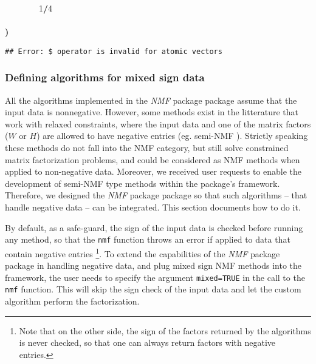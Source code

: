 \documentclass[a4paper]{article}\usepackage{graphicx, color}
\makeatletter
\newcommand{\hlnumber}[1]{\textcolor[rgb]{0,0,0}{#1}}%
\newcommand{\hlkeyword}[1]{\textcolor[rgb]{0,0,0}{\textbf{#1}}}%
\newcommand{\hlstd}[1]{\textcolor[rgb]{0,0,0}{#1}}%
\newenvironment{kframe}{%
 \def\FrameCommand##1{\hskip\@totalleftmargin \hskip-\fboxsep
 \colorbox{shadecolor}{##1}\hskip-\fboxsep
     \hskip-\linewidth \hskip-\@totalleftmargin \hskip\columnwidth}%
 \MakeFramed {\advance\hsize-\width
   \@totalleftmargin\z@ \linewidth\hsize
   \@setminipage}}%
 {\par\unskip\endMakeFramed}
\newenvironment{knitrout}{}{} %
\let\code=\texttt
\newcommand{\pkgname}[1]{\textit{#1}\xspace}
\newcommand{\Rpkg}[1]{\pkgname{#1} package\xspace}
\newcommand{\nmfpack}{\Rpkg{NMF}}
\makeatother
\begin{document}
\begin{knitrout}
\begin{kframe}
\begin{flushleft}
\hlstd{}{\ }{\ }{\ }{\ }{\ }{\ }{\ }{\ }\hlnumber{1}\hlkeyword{/}\hlnumber{4}\hspace*{\fill}\\
\hlstd{}{\ }{\ }{\ }{\ }\hlkeyword{\usebox{\hlnormalsizeboxclosebrace}}\hspace*{\fill}\\
\hlstd{}\hlkeyword{\usebox{\hlnormalsizeboxclosebrace}}\hlkeyword{)}\mbox{}
\normalfont
\end{flushleft}
\begin{verbatim}
## Error: $ operator is invalid for atomic vectors
\end{verbatim}
\end{kframe}
\end{knitrout}


%
%

\subsubsection{Defining algorithms for mixed sign data}
All the algorithms implemented in the \nmfpack package assume that the input data is nonnegative.
However, some methods exist in the litterature that work with relaxed constraints, where the input data and one of the matrix factors ($W$ or $H$) are allowed to have negative entries (eg. semi-NMF \cite{Ding2008, Roux2008}).
Strictly speaking these methods do not fall into the NMF category, but still solve constrained matrix factorization problems, and could be considered as NMF methods when applied to non-negative data.
Moreover, we received user requests to enable the development of semi-NMF type methods within the package's framework.
Therefore, we designed the \nmfpack package so that such algorithms -- that handle negative data -- can be integrated. This section documents how to do it.

By default, as a safe-guard, the sign of the input data is checked before running any method, so that the \code{nmf} function throws an error if applied to data that contain negative entries \footnote{Note that on the other side, the sign of the factors returned by the algorithms is never checked, so that one can always return factors with negative entries.}.
To extend the capabilities of the \nmfpack package in handling negative data, and plug mixed sign NMF methods into the framework, the user needs to specify the argument \code{mixed=TRUE} in the call to the \code{nmf} function.
This will skip the sign check of the input data and let the custom algorithm perform the factorization.
 
\end{document}
